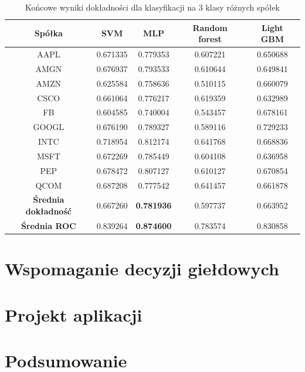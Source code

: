 \documentclass[a4paper, twoside, 11pt, openright]{article}
\begin{document}
 \begin{table}[H]
    \centering
    \begin{tabular}{|c|c|c|c|c|}
    \hline
        \textbf{Spółka} & \textbf{SVM} &  \textbf{MLP}  &  \textbf{Random forest}  &  \textbf{Light GBM} \\ \hline
AAPL   &  0.671335 & 0.779353  & 0.607221 & 0.650688 \\ \hline
AMGN   &  0.676937 &  0.793533 & 0.610644 &  0.649841 \\ \hline
AMZN   &  0.625584 & 0.758636 & 0.510115  & 0.660079 \\ \hline
CSCO   &  0.661064 &  0.776217 & 0.619359 &  0.632989 \\ \hline
FB     &  0.604585 & 0.740004 & 0.543457 & 0.678161 \\ \hline
GOOGL  &  0.676190 &  0.789327 & 0.589116 & 0.729233 \\ \hline
INTC   &  0.718954 & 0.812174  & 0.641768 & 0.668836 \\ \hline
MSFT   &  0.672269 &   0.785449 & 0.604108 &  0.636958 \\ \hline
PEP    &  0.678472 & 0.807127  & 0.610127 & 0.670854 \\ \hline
QCOM   &  0.687208 &  0.777542 & 0.641457 & 0.661878 \\ \hline \hline
\textbf{Średnia dokładność} &  0.667260 & \textbf{0.781936} & 0.597737 & 0.663952 \\  \hline  
\textbf{Średnia ROC} &  0.839264 & \textbf{0.874600} & 0.783574 & 0.830858 \\  \hline
    \end{tabular}
    \caption{Końcowe wyniki dokładności dla klasyfikacji na 3 klasy różnych spółek}
    \label{tab:comparison_final_discrete}
\end{table}   

\section{Wspomaganie decyzji giełdowych}

\section{Projekt aplikacji}

\section{Podsumowanie}


\newpage
\end{document}

